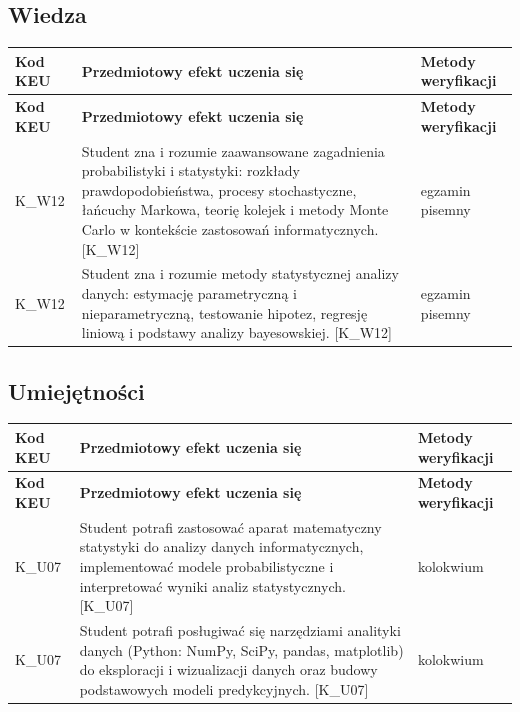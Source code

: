 \documentclass[12pt, a4paper]{article}
\newcommand{\thdrule}{\noalign{\global\setlength{\extrarowheight}{0pt}}}
\newcommand{\thdend}{\noalign{\global\setlength{\extrarowheight}{3pt}}}
\begin{document}
\subsection*{Wiedza}
{\scriptsize
\begin{longtable}{m{1.6cm}m{9.0cm}m{4.2cm}}
\thdrule\toprule
\rowcolor{pjatkRed} {\color{white}\footnotesize\textbf{\vphantom{Ag}Kod KEU}} & {\color{white}\footnotesize\textbf{\vphantom{Ag}Przedmiotowy efekt uczenia się}} & {\color{white}\footnotesize\textbf{\vphantom{Ag}Metody weryfikacji}} \\
\midrule\thdend
\endfirsthead
\thdrule\toprule
\rowcolor{pjatkRed} {\color{white}\footnotesize\textbf{\vphantom{Ag}Kod KEU}} & {\color{white}\footnotesize\textbf{\vphantom{Ag}Przedmiotowy efekt uczenia się}} & {\color{white}\footnotesize\textbf{\vphantom{Ag}Metody weryfikacji}} \\
\midrule\thdend
\endhead
  \rowcolor{tableRowLight} K\_W12 & Student zna i rozumie zaawansowane zagadnienia probabilistyki i statystyki: rozkłady prawdopodobieństwa, procesy stochastyczne, łańcuchy Markowa, teorię kolejek i metody Monte Carlo w kontekście zastosowań informatycznych. {[}K\_W12{]} & egzamin pisemny \\
  \rowcolor{tableRowAlt} K\_W12 & Student zna i rozumie metody statystycznej analizy danych: estymację parametryczną i nieparametryczną, testowanie hipotez, regresję liniową i podstawy analizy bayesowskiej. {[}K\_W12{]} & egzamin pisemny \\
\bottomrule
\end{longtable}}

\subsection*{Umiejętności}
{\scriptsize
\begin{longtable}{m{1.6cm}m{9.0cm}m{4.2cm}}
\thdrule\toprule
\rowcolor{pjatkRed} {\color{white}\footnotesize\textbf{\vphantom{Ag}Kod KEU}} & {\color{white}\footnotesize\textbf{\vphantom{Ag}Przedmiotowy efekt uczenia się}} & {\color{white}\footnotesize\textbf{\vphantom{Ag}Metody weryfikacji}} \\
\midrule\thdend
\endfirsthead
\thdrule\toprule
\rowcolor{pjatkRed} {\color{white}\footnotesize\textbf{\vphantom{Ag}Kod KEU}} & {\color{white}\footnotesize\textbf{\vphantom{Ag}Przedmiotowy efekt uczenia się}} & {\color{white}\footnotesize\textbf{\vphantom{Ag}Metody weryfikacji}} \\
\midrule\thdend
\endhead
  \rowcolor{tableRowLight} K\_U07 & Student potrafi zastosować aparat matematyczny statystyki do analizy danych informatycznych, implementować modele probabilistyczne i interpretować wyniki analiz statystycznych. {[}K\_U07{]} & kolokwium \\
  \rowcolor{tableRowAlt} K\_U07 & Student potrafi posługiwać się narzędziami analityki danych (Python: NumPy, SciPy, pandas, matplotlib) do eksploracji i wizualizacji danych oraz budowy podstawowych modeli predykcyjnych. {[}K\_U07{]} & kolokwium \\
\bottomrule
\end{longtable}}
\end{document}

